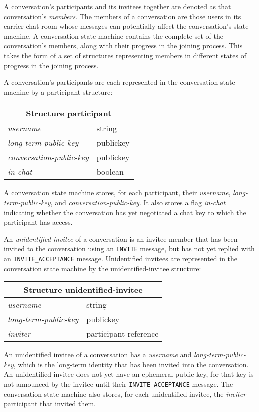 \documentclass{article}
\def\message#1{\texttt{#1}}
\def\smfield#1{\textsl{#1}}
\def\type#1{\textsf{#1}}
\newenvironment{struct}[1]{
\newcommand{\structfield}[2]{
\smfield{##1} & \type{##2} \\
\hline
}
\par
\vspace{-\medskipamount}
\hspace{2em minus 2em}\begin{tabular}{|l|l|}
\hline
\multicolumn{2}{|c|}{Structure \type{#1}} \\
\hline
\hline
}{
\end{tabular}
\vspace{-\medskipamount}
\par
}
\begin{document}
A conversation's participants and its invitees together are denoted as that conversation's \emph{members}.
The members of a conversation are those users in its carrier chat room whose messages can potentially affect the conversation's state machine.
A conversation state machine contains the complete set of the conversation's members, along with their progress in the joining process.
This takes the form of a set of structures representing members in different states of progress in the joining process.

A conversation's participants are each represented in the conversation state machine by a \type{participant} structure:
\begin{struct}{participant}
\structfield{username}{string}
\structfield{long-term-public-key}{publickey}
\structfield{conversation-public-key}{publickey}
\structfield{in-chat}{boolean}
\end{struct}
A conversation state machine stores, for each participant, their \smfield{username}, \smfield{long-term-public-key}, and \smfield{conversation-public-key}.
It also stores a flag \smfield{in-chat} indicating whether the conversation has yet negotiated a chat key to which the participant has access.

An \emph{unidentified invitee} of a conversation is an invitee member that has been invited to the conversation using an \message{INVITE} message, but has not yet replied with an \message{INVITE\_ACCEPTANCE} message.
Unidentified invitees are represented in the conversation state machine by the \type{unidentified-invitee} structure:
\begin{struct}{unidentified-invitee}
\structfield{username}{string}
\structfield{long-term-public-key}{publickey}
\structfield{inviter}{participant reference}
\end{struct}
An unidentified invitee of a conversation has a \smfield{username} and \smfield{long-term-public-key}, which is the long-term identity that has been invited into the conversation.
An unidentified invitee does not yet have an ephemeral public key, for that key is not announced by the invitee until their \message{INVITE\_ACCEPTANCE} message.
The conversation state machine also stores, for each unidentified invitee, the \smfield{inviter} participant that invited them.
\end{document}
